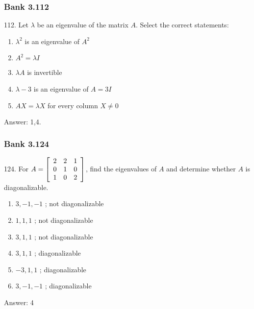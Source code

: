 \documentclass[pdf,9pt,t]{beamer}
\begin{document}
\begin{frame}[fragile]
    \frametitle{Bank 3.112}
    \begin{problem}
	112. Let $\lambda$ be an eigenvalue of the matrix $A$. Select the correct statements:
	\begin{enumerate}
	    \item $\lambda^{2}$ is an eigenvalue of $A^{2}$
	    \item $A^{2}=\lambda I$
	    \item $\lambda A$ is invertible
	    \item $\lambda-3$ is an eigenvalue of $A=3I$
	    \item $AX=\lambda X$ for every column $X\neq0$
	\end{enumerate}
    \end{problem}
    \pause Answer: 1,4.
\end{frame}

\begin{frame}[fragile]
    \frametitle{Bank 3.124}
    \begin{problem}
	124. For $A=\left[
	    \begin{array}[c]{ccc}
		2 &  2 &  1\\
		0 &  1 &  0\\
		1 &  0 &  2
	    \end{array}
	    \right]$, find the eigenvalues of $A$ and determine whether $A$ is diagonalizable.
	\begin{enumerate}
	    \item $3,-1,-1$ ; not diagonalizable
	    \item $1,1,1$   ; not diagonalizable
	    \item $3,1,1$   ; not diagonalizable
	    \item $3,1,1$   ; diagonalizable
	    \item $-3,1,1$  ; diagonalizable
	    \item $3,-1,-1$ ; diagonalizable
	\end{enumerate}
    \end{problem}
    \pause
    Answer: 4
\end{frame}
\end{document}
